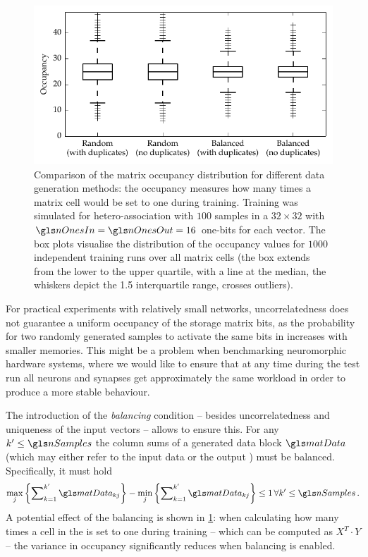 \begin{figure}
	\centering
	\includegraphics{media/chp3/binam_occupancy_data.pdf}
	\caption[Comparison of the BiNAM matrix occupancy for different data generation methods]{Comparison of the \BiNAM matrix occupancy distribution for different data generation methods: the occupancy measures how many times a \BiNAM matrix cell would be set to one during training. Training was simulated for hetero-association with $100$ samples in a $32 \times 32$ \BiNAM with $\nOnesIn = \nOnesOut = 16$ one-bits for each vector. The box plots visualise the distribution of the occupancy values for $1000$ independent training runs over all matrix cells (the box extends from the lower to the upper quartile, with a line at the median, the whiskers depict the 1.5 interquartile range, crosses outliers).}
	\label{fig:binam_occupancy_data}
\end{figure}

For practical experiments with relatively small networks, uncorrelatedness does not guarantee a uniform occupancy of the storage matrix bits, as the probability for two randomly generated samples to activate the same bits in \memMat increases with smaller memories. This might be a problem when benchmarking neuromorphic hardware systems, where we would like to ensure that at any time during the test run all neurons and synapses get approximately the same workload in order to produce a more stable behaviour.

The introduction of the \emph{balancing} condition -- besides uncorrelatedness and uniqueness of the input vectors -- allows to ensure this. For any $k' \leq \nSamples$ the column sums of a generated data block $\matData$ (which may either refer to the input data \matIn or the output \matOut) must be balanced. Specifically, it must hold
\begin{align}
	\max_j\left\{\sum\nolimits_{k = 1}^{k'} \matData_{kj}\right\} - \min_j\left\{\sum\nolimits_{k = 1}^{k'} \matData_{kj}\right\} \leq 1 \, \forall k' \leq \nSamples \,.
	\label{eqn:balancing_condition}
\end{align}
A potential effect of the balancing is shown in \cref{fig:binam_occupancy_data}: when calculating how many times a cell in the \BiNAM is set to one during training -- which can be computed as  $X^T \cdot Y$ -- the variance in occupancy significantly reduces when balancing is enabled.

